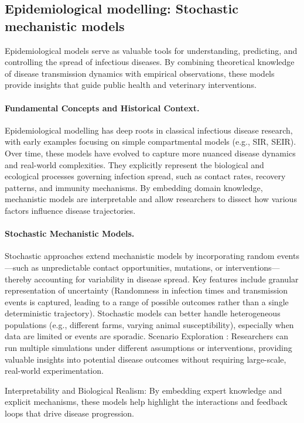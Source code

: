 \subsection{Epidemiological modelling: Stochastic mechanistic models}

Epidemiological models serve as valuable tools for understanding, predicting, and controlling the spread of infectious diseases. By combining theoretical knowledge of disease transmission dynamics with empirical observations, these models provide insights that guide public health and veterinary interventions.

\paragraph{Fundamental Concepts and Historical Context.} Epidemiological modelling has deep roots in classical infectious disease research, with early examples focusing on simple compartmental models (e.g., SIR, SEIR). Over time, these models have evolved to capture more nuanced disease dynamics and real-world complexities. They explicitly represent the biological and ecological processes governing infection spread, such as contact rates, recovery patterns, and immunity mechanisms. By embedding domain knowledge, mechanistic models are interpretable and allow researchers to dissect how various factors influence disease trajectories.

\paragraph{Stochastic Mechanistic Models.} Stochastic approaches extend mechanistic models by incorporating random events—such as unpredictable contact opportunities, mutations, or interventions—thereby accounting for variability in disease spread. Key features include granular representation of uncertainty (Randomness in infection times and transmission events is captured, leading to a range of possible outcomes rather than a single deterministic trajectory). Stochastic models can better handle heterogeneous populations (e.g., different farms, varying animal susceptibility), especially when data are limited or events are sporadic. Scenario Exploration : Researchers can run multiple simulations under different assumptions or interventions, providing valuable insights into potential disease outcomes without requiring large-scale, real-world experimentation.

Interpretability and Biological Realism: By embedding expert knowledge and explicit mechanisms, these models help highlight the interactions and feedback loops that drive disease progression.

